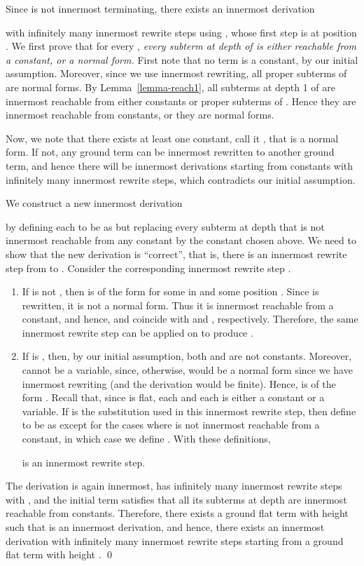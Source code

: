 \documentclass{LMCS}
\theoremstyle{plain}
\begin{document}
Since  is not innermost terminating,
there exists an
innermost derivation

with infinitely many innermost rewrite steps using ,
whose first step is at position . 
We first prove that for every ,
{\em every subterm at depth  of  is either
reachable from a constant, or a normal form.}
First note that no term
 is a constant, by our initial assumption.
Moreover, since we use innermost rewriting,
all proper subterms of  are normal forms. 
By Lemma~\ref{lemma-reach1}, all subterms at depth 1
of  are innermost reachable from either constants or proper
subterms of . Hence
they are innermost reachable from constants, or they are normal forms.

Now, we note that there exists at least one constant,
call it , that is
a normal form.  If not, any ground term can be 
innermost rewritten to another ground term, and 
hence there will be innermost derivations starting from
constants with infinitely many innermost rewrite steps,
which contradicts our initial assumption.

We construct a new innermost derivation

by defining each  to be as  but replacing every
subterm at depth  that is not innermost reachable from any constant
by the constant  chosen above. We need to show that 
the new derivation is ``correct'', that is,
there is an innermost rewrite step from  to .
Consider the corresponding innermost rewrite step 
.
\begin{enumerate}[]
\item If  is not , then  is
of the form  for some  in 
and some position . Since  is rewritten,
it is not a normal form. Thus it is innermost reachable from a constant,
and hence,  and  coincide with
 and , respectively.
Therefore, the same innermost rewrite step can be applied on 
to produce .
\item If  is , then,
by our initial assumption, both  and  are not constants.
Moreover,  cannot be a variable, since, 
otherwise,  would be a normal form
since we have innermost rewriting (and the derivation would
be finite).
Hence,  is of the form
.
Recall that, since  is flat, each  and each 
is either a constant or a variable.
If  is the substitution used in this innermost rewrite step,
then define  to be as  except for the cases where 
 is not innermost reachable from a constant, in which case we
define . With these definitions,

is an innermost rewrite step.
\end{enumerate}
The derivation  is again innermost,
has infinitely many innermost rewrite steps with , and the
initial term  satisfies that all its
subterms at depth  are innermost reachable from constants.
Therefore, there exists a ground flat term  with height  such that
 is an innermost derivation,
and hence, there exists
an innermost derivation with infinitely many innermost rewrite
steps starting from a ground flat term 
with height .  \qed
\end{document}
